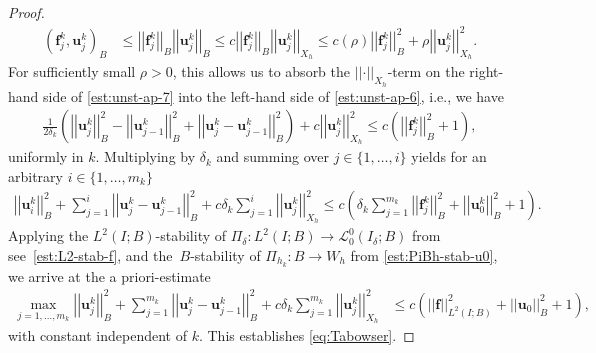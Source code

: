 \documentclass[reqno,a4paper]{amsart}
\def\norm#1{\left|\!\left| #1 \right|\!\right|}
\def\vec#1{\boldsymbol{#1}}
\def\Bh{{W_h}}
\def\bf{\vec{f}}
\def\bu{\vec{u}}
\begin{document}
\begin{proof}
\begin{equation}
		\begin{aligned}
			({\bf}^k_j,{\bu}^k_j)_B 
			&  \leq 
			\norm{ \bf_j^k}_{B} \norm{  \bu_j^k}_{B}	
			\leq 
			c \norm{ \bf_j^k}_{B} \norm{ \bu_j^k}_{X_h}
			\leq 
			c(\rho) \norm{ \bf_j^k}_{B}^2 +  \rho \norm{ \bu_j^k}_{X_h}^2. 
		\end{aligned}
	\end{equation}
	For sufficiently small $\rho>0$, this allows us to absorb the $\norm{\cdot}_{X_h}$-term on the right-hand side of \eqref{est:unst-ap-7} into the left-hand side of \eqref{est:unst-ap-6}, i.e., we have
	\begin{align}\label{est:unst-ap-8}
		\tfrac{1}{2\delta_k} \left(\norm{{\bu}^k_j}_B^2 - \norm{{\bu}^k_{j-1}}_B^2 
		+ \norm{{\bu}^k_j - {\bu}^k_{j-1}}_B^2 \right) 
		+ 	c\norm{ \bu_j^k}_{X_h}^2 
		\leq c \left(\norm{ \bf_j^k}_{B}^2 + 1\right),
	\end{align}
	uniformly in $k$.  
	Multiplying by $\delta_k$ and summing over $j\in\{ 1, \ldots, i\}$ yields for an arbitrary $i  \in \{1, \ldots, m_k\}$ 
	\begin{align}\label{est:unst-ap-9}
		\norm{{\bu}^k_i}_B^2 
		+ \sum_{j = 1}^i \norm{{\bu}^k_j - {\bu}^k_{j-1}}_B^2 
		+ 	c  \delta_k \sum_{j = 1}^i  \norm{ \bu_j^k}_{X_h}^2 
		\leq c\left(
		\delta_k \sum_{j = 1}^{m_k} \norm{ \bf_j^k}_{B}^2  + \norm{{\bu}^k_{0}}_B^2 + 1 \right). 
	\end{align}
	Applying the $L^2(I;B)$-stability of $\Pi_{\delta} \colon L^2(I;B) \to \mathcal{L}^0_0(I_\delta;B)$ from  see~\eqref{est:L2-stab-f}, and the~$B$-stability of $\Pi_{h_k} \colon B \to \Bh$ from \eqref{est:PiBh-stab-u0}, we arrive at the  a priori-estimate 
	\begin{equation}\label{est:unst-ap-10}
		\begin{aligned} 
			\max_{j = 1, \ldots, m_k} \norm{{\bu}^k_j}_B^2  + \sum_{j = 1}^{m_k} \norm{{\bu}^k_j - {\bu}^k_{j-1}}_B^2 
			+ 	c  \delta_k \sum_{j = 1}^{m_k}  \norm{ \bu_j^k}_{X_h}^2  
			& \leq 	 c\left( \norm{ \bf}_{L^2(I;B)}^2 + \norm{ \bu_0}_B^2 + 1 \right),
		\end{aligned} 
	\end{equation}
	with constant independent of $k$. 
	This establishes \eqref{eq:Tabowser}. 
	

\end{proof}
\end{document}
